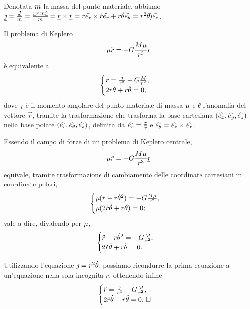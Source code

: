 \Proof Denotata $m$ la massa del punto materiale, abbiamo $\underline{\jmath} = \frac{\underline{J}}{m} = \frac{\underline{r} \times m \dot{\underline{r}}}{m} = \underline{r} \times \dot{\underline{r}} = r \widehat{e_r} \times \dot{r}\widehat{e_r} + r\dot{\theta}\widehat{e_\theta} = r^2\dot{\theta}) \widehat{e_z}$. \EndProof
\begin{Theorem}
	Il problema di Keplero
	\[
		\mu \ddot{\underline{r}} = - G \frac{M\mu}{r^3}\underline{r}
	\]
	\`e equivalente a
	\[
		\begin{cases}
			\ddot{r} = \frac{\jmath}{r^3} - G \frac{M}{r^2},\\
			2 \dot{r}\dot{\theta} + r \ddot{\theta} = 0,
		\end{cases}
	\]
	dove $\jmath$ \`e il momento angolare del punto materiale di massa $\mu$ e $\theta$ l'anomalia del vettore $\vec{r}$, tramite la trasformazione che trasforma la base cartesiana $(\widehat{e_x},\widehat{e_y},\widehat{e_z})$ nella base polare $(\widehat{e_r},\widehat{e_\theta},\widehat{e_z})$, definita da $\widehat{e_r} = \frac{\underline{r}}{r}$ e $\widehat{e_\theta} = \widehat{e_z} \times \widehat{e_r}$.
\end{Theorem}
\Proof Essendo il campo di forze di un problema di Keplero centrale,
\[
	\mu \ddot{r} = - G \frac{M\mu}{r^3}\underline{r}
\]
equivale, tramite trasformazione di cambiamento delle coordinate cartesiani in coordinate polari,
\[
	\begin{cases}
		\mu (\ddot{r} - r \dot{\theta}^2) = - G \frac{M\mu}{r^2},\\
		\mu (2\dot{r}\dot{\theta} + r \ddot{\theta}) = 0;
	\end{cases}
\]
vale a dire, dividendo per $\mu$,
\[
	\begin{cases}
		\ddot{r} - r \dot{\theta}^2 = - G \frac{M}{r^2},\\
		2\dot{r}\dot{\theta} + r \ddot{\theta} = 0.
	\end{cases}
\]
\par Utilizzando l'equazione $\jmath = r^2\dot{\theta}$, possiamo ricondurre la prima equazione a un'equazione nella sola incognita $r$, ottenendo infine
\[
	\begin{cases}
		\ddot{r} = \frac{\jmath}{r^3} - G \frac{M}{r^2},\\
		2 \dot{r}\dot{\theta} + r \ddot{\theta} = 0.\text{ $\square$}
	\end{cases}
\]
